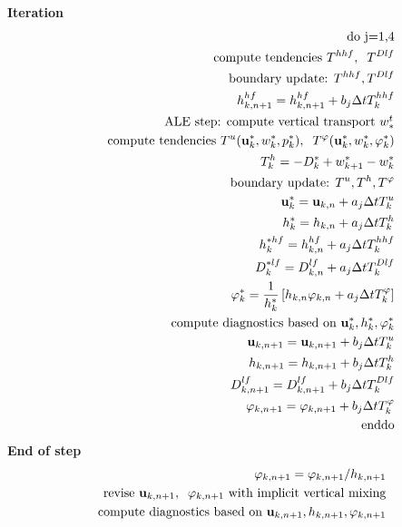 \documentclass[11pt]{report}
\begin{document}
{\bf Iteration}
\begin{eqnarray} &&
\mbox{do j=1,4} \\&& \hspace{.5cm}
\mbox{compute tendencies } T^{hhf}, \;\;T^{Dlf} \\ && \hspace{.5cm}
\mbox{boundary update: } T^{hhf},T^{Dlf}\\&& \hspace{.5cm}
h^{hf}_{k,n+1} = h^{hf}_{k,n+1} + b_j \Delta t T^{hhf}_k \\&& \hspace{.5cm}
\mbox{ALE step: compute vertical transport $w^t_*$} \\ && \hspace{.5cm}
\mbox{compute tendencies } 
T^u({\bf u}_k^*,w_k^*,p_k^*), \;\;
T^\varphi({\bf u}_k^*,w_k^*,\varphi_k^*) \\ && \hspace{.5cm}\hspace{.5cm}
T^h_k = -D_k^* + w_{k+1}^* - w_{k}^* \\ && \hspace{.5cm}
\mbox{boundary update: } T^u,T^h,T^\varphi\\&& \hspace{.5cm}
{\bf u}^*_k = {\bf u}_{k,n} + a_j \Delta t T^u_k \\&& \hspace{.5cm}
h^*_k = h_{k,n} + a_j \Delta t T^h_k \\&& \hspace{.5cm}
h^{*hf}_k = h^{hf}_{k,n} + a_j \Delta t T^{hhf}_k \\&& \hspace{.5cm}
D^{*lf}_k = D^{lf}_{k,n} + a_j \Delta t T^{Dlf}_k \\&& \hspace{.5cm}
{\varphi}_k^* = \frac{1}{h_k^*} \left[
h_{k,n} \varphi_{k,n} 
+ a_j \Delta t  T^\varphi_k \right]
\\&& \hspace{.5cm}
\mbox{compute diagnostics based on }{\bf u}_k^*,h_k^*,\varphi_k^* \\&& \hspace{.5cm}
{\bf u}_{k,n+1} = {\bf u}_{k,n+1} + b_j \Delta t T^u_k \\&& \hspace{.5cm}
h_{k,n+1} = h_{k,n+1} + b_j \Delta t T^h_k \\&& \hspace{.5cm}
D^{lf}_{k,n+1} = D^{lf}_{k,n+1} + b_j \Delta t T^{Dlf}_k \\&& \hspace{.5cm}
{\varphi}_{k,n+1} = 
 \varphi_{k,n+1} 
+ b_j \Delta t  T^\varphi_k \\&&
\mbox{enddo}
\end{eqnarray}
{\bf End of step}
\begin{eqnarray} &&
\varphi_{k,n+1} = 
 \varphi_{k,n+1} / h_{k,n+1} \\&&
\mbox{revise } {\bf u}_{k,n+1},\;\;\varphi_{k,n+1} \mbox{ with implicit vertical mixing}\\&&
\mbox{compute diagnostics based on }{\bf u}_{k,n+1},h_{k,n+1},\varphi_{k,n+1} 
\end{eqnarray}
\end{document}
